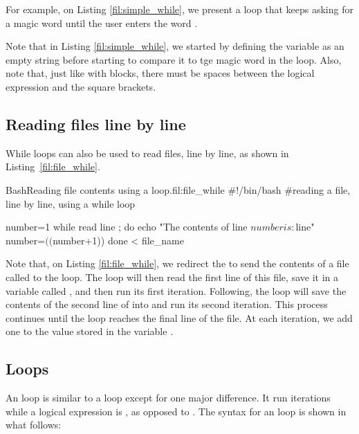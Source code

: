 For example, on Listing \ref{fil:simple_while}, we present a loop that keeps asking for a magic word until the user enters the word .

Note that in Listing \ref{fil:simple_while},  we started by defining the variable  as an empty string before starting to compare it to tge magic word in the loop. Also, note that, just like with  blocks, there must be spaces between the logical expression and the square brackets.

\subsection{Reading files line by line}
While loops can also be used to read files, line by line, as shown in Listing~\ref{fil:file_while}.

\begin{source_code_float}{Bash}{Reading file contents using a  loop.}{fil:file_while}
#!/bin/bash
#reading a file, line by line, using a while loop

number=1
while read line ; do    
   echo "The contents of line $number is: $line"
   number=$(($number+1))  
done < file_name
\end{source_code_float}
Note that, on Listing \ref{fil:file_while}, we redirect the  to send the contents of a file called  to the  loop. The loop will then read the first line of this file, save it in a variable called , and then run its first iteration. Following, the loop will save the contents of the second line of  into  and run its second iteration. This process continues until the loop reaches the final line of the file. At each iteration, we add one to the value stored in the variable .

\subsection{ Loops}
An  loop is similar to a  loop except for one major difference. It run iterations while a logical expression is , as opposed to . The syntax for an  loop is shown in what follows:

